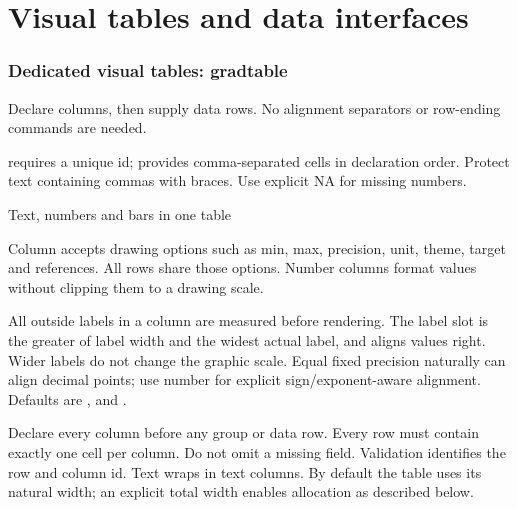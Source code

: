\part{Visual tables and data interfaces}


\section{Dedicated visual tables: gradtable}
Declare columns, then supply data rows. No alignment separators or row-ending
commands are needed.

 requires a unique id;
 provides comma-separated cells in declaration order.
Protect text containing commas with braces. Use explicit NA for missing numbers.
\begin{demo}{Text, numbers and bars in one table}
\begin{center}
\begin{gradtable}[align=c,header align=c,preset=paper,graphic width=48mm,
  text width=24mm,label width=14mm]
\end{gradtable}
\end{center}
\end{demo}
Column  accepts drawing options such as min, max, precision,
unit, theme, target and references. All rows share those options. Number columns
format values without clipping them to a drawing scale.

All outside labels in a column are measured before rendering. The label slot is
the greater of label width and the widest actual label, and aligns values right.
Wider labels do not change the graphic scale. Equal fixed precision naturally
can align decimal points; use number  for explicit sign/exponent-aware alignment.
Defaults are ,  and .

Declare every column before any group or data row. Every row must contain exactly
one cell per column. Do not omit a missing field. Validation identifies the row
and column id. Text wraps in text columns. By default the table uses its natural
width; an explicit total width enables allocation as described below.
